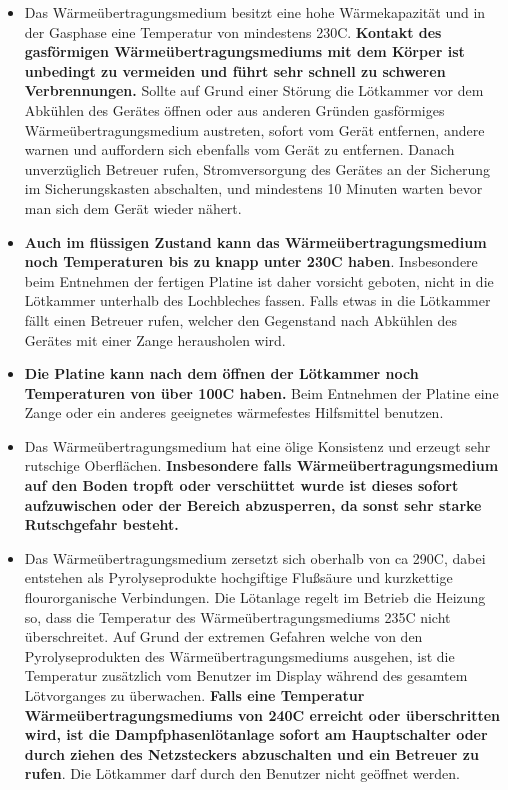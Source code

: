 \documentclass{\basedir/fablab-document}
\begin{document}
	\begin{itemize}
	\item Das W{\"a}rme{\"u}bertragungsmedium besitzt eine hohe W{\"a}rmekapazit{\"a}t und in der Gasphase eine Temperatur von mindestens 230\textdegree C. \textbf{Kontakt des gasf{\"o}rmigen W{\"a}rme{\"u}bertragungsmediums mit dem K{\"o}rper ist unbedingt zu vermeiden und f{\"u}hrt sehr schnell zu schweren Verbrennungen.} Sollte auf Grund einer St{\"o}rung die L{\"o}tkammer vor dem Abk{\"u}hlen des Ger{\"a}tes {\"o}ffnen oder aus anderen Gr{\"u}nden gasf{\"o}rmiges W{\"a}rme{\"u}bertragungsmedium austreten, sofort vom Ger{\"a}t entfernen, andere warnen und auffordern sich ebenfalls vom Ger{\"a}t zu entfernen. Danach unverz{\"u}glich Betreuer rufen, Stromversorgung des Ger{\"a}tes an der Sicherung im Sicherungskasten abschalten, und mindestens 10 Minuten warten bevor man sich dem Ger{\"a}t wieder n{\"a}hert.
	\item \textbf{Auch im fl{\"u}ssigen Zustand kann das W{\"a}rme{\"u}bertragungsmedium noch Temperaturen bis zu knapp unter 230\textdegree C haben}. Insbesondere beim Entnehmen der fertigen Platine ist daher vorsicht geboten, nicht in die L{\"o}tkammer unterhalb des Lochbleches fassen. Falls etwas in die L{\"o}tkammer f{\"a}llt einen Betreuer rufen, welcher den Gegenstand nach Abk{\"u}hlen des Ger{\"a}tes mit einer Zange herausholen wird.
	\item \textbf{Die Platine kann nach dem {\"o}ffnen der L{\"o}tkammer noch Temperaturen von {\"u}ber 100\textdegree C haben.} Beim Entnehmen der Platine eine Zange oder ein anderes geeignetes w{\"a}rmefestes Hilfsmittel benutzen.
	\item Das W{\"a}rme{\"u}bertragungsmedium hat eine {\"o}lige Konsistenz und erzeugt sehr rutschige Oberfl{\"a}chen. \textbf{Insbesondere falls W{\"a}rme{\"u}bertragungsmedium auf den Boden tropft oder versch{\"u}ttet wurde ist dieses sofort aufzuwischen oder der Bereich abzusperren, da sonst sehr starke Rutschgefahr besteht.}
	\item Das W{\"a}rme{\"u}bertragungsmedium zersetzt sich oberhalb von ca 290\textdegree C, dabei entstehen als Pyrolyseprodukte hochgiftige Flu{\ss}s{\"a}ure und kurzkettige flourorganische Verbindungen. Die L{\"o}tanlage regelt im Betrieb die Heizung so, dass die Temperatur des W{\"a}rme{\"u}bertragungsmediums 235C nicht {\"u}berschreitet. Auf Grund der extremen Gefahren welche von den Pyrolyseprodukten des W{\"a}rme{\"u}bertragungsmediums ausgehen, ist die Temperatur zus{\"a}tzlich vom Benutzer im Display w{\"a}hrend des gesamtem L{\"o}tvorganges zu {\"u}berwachen. \textbf{Falls eine Temperatur W{\"a}rme{\"u}bertragungsmediums von 240\textdegree C erreicht oder {\"u}berschritten wird, ist die Dampfphasenl{\"o}tanlage sofort am Hauptschalter oder durch ziehen des Netzsteckers abzuschalten und ein Betreuer zu rufen}. Die L{\"o}tkammer darf durch den Benutzer nicht ge{\"o}ffnet werden.

\end{itemize}
\end{document}
